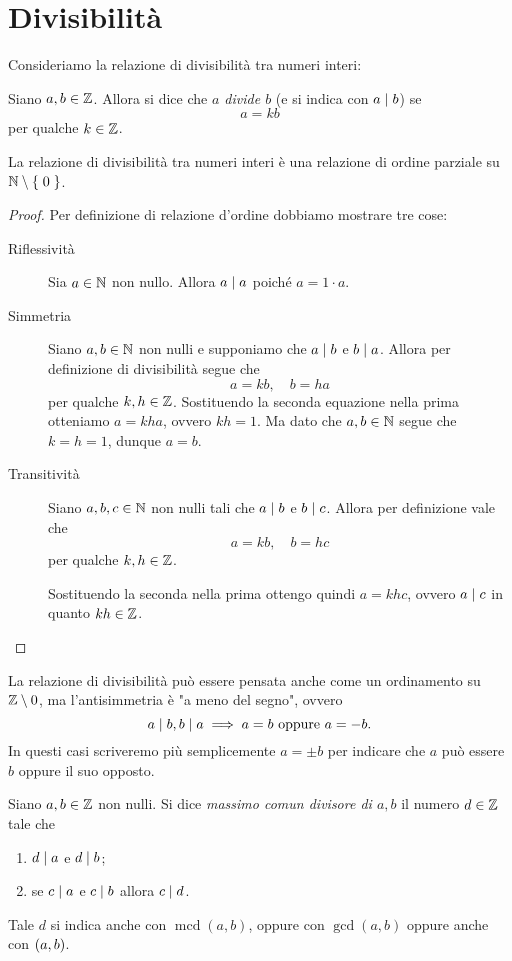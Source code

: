 \section{Divisibilità}

Consideriamo la relazione di divisibilità tra numeri interi:
\begin{definition}
    [Divisibilità]
    Siano $a, b \in \mathbb{Z}$. Allora si dice che \emph{$a$ divide $b$} (e si indica con $a \mid b$) se \[
        a = kb
    \] per qualche $k \in \mathbb{Z}$.
\end{definition}

\begin{proposition}
    La relazione di divisibilità tra numeri interi è una relazione di ordine parziale su $\mathbb{N} \setminus \left\{\;0\;\right\}$.
\end{proposition}
\begin{proof}
    Per definizione di relazione d'ordine dobbiamo mostrare tre cose:
    \begin{description}
        \item[Riflessività] Sia $a \in \mathbb{N}$ non nullo. Allora $a \mid a$ poiché $a = 1\cdot a$.
        \item[Simmetria] Siano $a, b \in \mathbb{N}$ non nulli e supponiamo che $a \mid b$ e $b \mid a$. Allora per definizione di divisibilità segue che \[
            a = kb, \quad b = ha    
        \]  per qualche $k, h \in \mathbb{Z}$. Sostituendo la seconda equazione nella prima otteniamo $a = kha$, ovvero $kh = 1$. Ma dato che $a, b \in \mathbb{N}$ segue che $k = h = 1$, dunque $a = b$.
        \item[Transitività] Siano $a, b, c \in \mathbb{N}$ non nulli tali che $a \mid b$ e $b \mid c$. Allora per definizione vale che \[
            a = kb, \quad b = hc    
        \] per qualche $k, h \in \mathbb{Z}$.

        Sostituendo la seconda nella prima ottengo quindi $a = khc$, ovvero $a \mid c$ in quanto $kh \in \mathbb{Z}$.
    \end{description}
\end{proof}

La relazione di divisibilità può essere pensata anche come un ordinamento su $\mathbb{Z} \setminus {0}$, ma l'antisimmetria è "a meno del segno", ovvero \[
    a \mid b, b \mid a \implies a = b \text{ oppure } a = -b.
\] In questi casi scriveremo più semplicemente $a = \pm b$ per indicare che $a$ può essere $b$ oppure il suo opposto.

\begin{definition}
    Siano $a, b \in \mathbb{Z}$ non nulli. Si dice \emph{massimo comun divisore di $a,b$} il numero $d \in \mathbb{Z}$ tale che \begin{enumerate}[label={(\roman*)}]
        \item $d \mid a$ e $d \mid b$;
        \item se $c \mid a$ e $c \mid b$ allora $c \mid d$.
    \end{enumerate}

    Tale $d$ si indica anche con $\operatorname{mcd}\!(a, b)$, oppure con $\gcd(a, b)$ oppure anche con $\left(a, b\right)$.
\end{definition}

